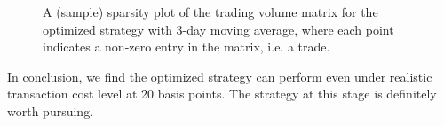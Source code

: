 \documentclass[11pt]{article}
\theoremstyle{definition}
\begin{document}
\begin{figure}[h]
\begin{center}
\end{center}
\centering
\caption{\label{fg:spy_volume_opt}
A (sample) sparsity plot of the trading volume matrix
for the optimized strategy with 3-day moving average,
where each point indicates a non-zero entry
in the matrix, i.e. a trade.
}
\end{figure}

In conclusion, we find the optimized strategy 
can perform even under realistic transaction cost
level at 20 basis points.
The strategy at this stage is definitely 
worth pursuing.
\end{document}
